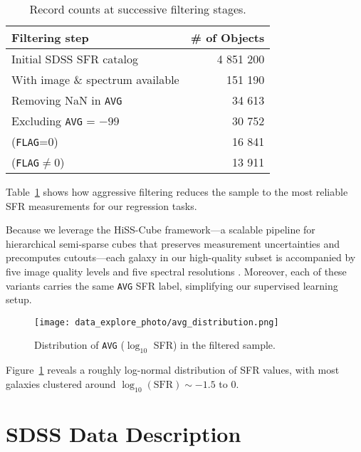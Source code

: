 \documentclass[english,bachelor,oneside]{ctufit-thesis}
\begin{document}
\begin{table}[H]
  \centering
  \caption{Record counts at successive filtering stages.}
  \label{tab:record_counts}
  \begin{tabular}{@{}lr@{}}
    \toprule
    Filtering step & \# of Objects \\
    \midrule
    Initial SDSS SFR catalog              & 4 851 200 \\
    With image \& spectrum available      & 151 190  \\
    Removing NaN in \texttt{AVG}          & 34 613   \\
    Excluding \texttt{AVG} = $-99$        & 30 752   \\
    \quad (\texttt{FLAG}=0)               & 16 841   \\
    \quad (\texttt{FLAG}$\neq$0)          & 13 911   \\
    \bottomrule
  \end{tabular}
\end{table}


Table~\ref{tab:record_counts} shows how aggressive filtering reduces the sample to the most reliable SFR measurements for our regression tasks.  

Because we leverage the HiSS-Cube framework—a scalable pipeline for hierarchical semi-sparse cubes that preserves measurement uncertainties and precomputes cutouts—each galaxy in our high-quality subset is accompanied by five image quality levels and five spectral resolutions \cite{nadvornik2021hiss}. Moreover, each of these variants carries the same \texttt{AVG} SFR label, simplifying our supervised learning setup.


\begin{figure}[H]
  \centering
  \texttt{[image: data\_explore\_photo/avg\_distribution.png]}
  \caption{Distribution of \texttt{AVG} (\(\log_{10}\) SFR) in the filtered sample.}
  \label{fig:avg_distribution}
\end{figure}
\noindent
Figure~\ref{fig:avg_distribution} reveals a roughly log-normal distribution of SFR values, with most galaxies clustered around \(\log_{10}(\mathrm{SFR})\sim-1.5\) to 0.  

\section{SDSS Data Description}
\end{document}
